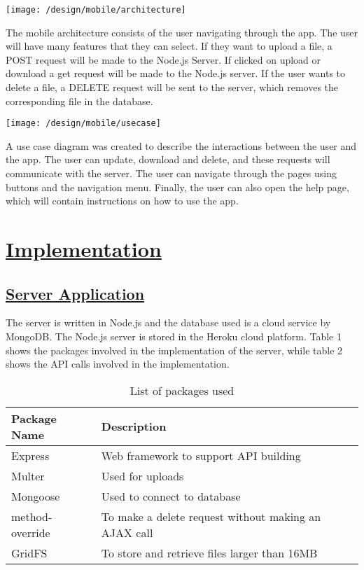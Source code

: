 \documentclass{article}
\begin{document}
\texttt{[image: /design/mobile/architecture]}

The mobile architecture consists of the user navigating through the app. The user will have many features that they can select. If they want to upload a file, a POST request will be made to the Node.js Server. If clicked on upload or download a get request will be made to the Node.js server. If the user wants to delete a file, a DELETE request will be sent to the server, which removes the corresponding file in the database.

\texttt{[image: /design/mobile/usecase]}

A use case diagram was created to describe the interactions between the user and the app. The user can update, download and delete, and these requests will communicate with the server. The user can navigate through the pages using buttons and the navigation menu. Finally, the user can also open the help page, which will contain instructions on how to use the app.

\section{\underline{Implementation}}
\subsection{\underline{Server Application}}
The server is written in Node.js and the database used is a cloud service by MongoDB. The Node.js server is stored in the Heroku cloud platform. Table 1 shows the packages involved in the implementation of the server, while table 2 shows the API calls involved in the implementation.
\begin{table}[h!]
\begin {center}
\captionsetup{justification=centering}
\caption{List of packages used}
\begin{tabular}{ l | l }
\hline
\textbf{Package Name} & \textbf{Description}\\
\hline
Express & Web framework to support API building\\
Multer & Used for uploads\\
Mongoose & Used to connect to database\\
method-override & To make a delete request without making an AJAX call\\
GridFS & To store and retrieve files larger than 16MB\\
\hline
\end{tabular}
\end{center}
\end{table}
\end{document}
